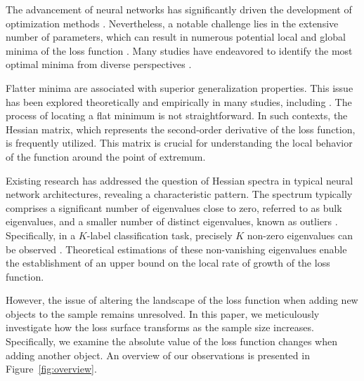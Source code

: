 \documentclass{article}
\begin{document}
The advancement of neural networks has significantly driven the development of optimization methods \cite{choi2020empiricalcomparisonsoptimizersdeep, Soydaner_2020, schmidt2021descendingcrowdedvalley}. Nevertheless, a notable challenge lies in the extensive number of parameters, which can result in numerous potential local and global minima of the loss function \cite{neyshabur2018the, zou2019improvedanalysistrainingoverparameterized, allenzhu2019convergencetheorydeeplearning, allenzhu2020learninggeneralizationoverparameterizedneural}. Many studies have endeavored to identify the most optimal minima from diverse perspectives \cite{choromanska2015losssurfacesmultilayernetworks, you2017largebatchtrainingconvolutional, li2018visualizinglosslandscapeneural}.

Flatter minima are associated with superior generalization properties. This issue has been explored theoretically and empirically in many studies, including \cite{NIPS1994_01882513, neyshabur2017exploringgeneralizationdeeplearning, dinh2017sharpminimageneralizedeep, fort2019emergentpropertieslocalgeometry}. The process of locating a flat minimum is not straightforward. In such contexts, the Hessian matrix, which represents the second-order derivative of the loss function, is frequently utilized. This matrix is crucial for understanding the local behavior of the function around the point of extremum.

Existing research \cite{pmlr-v97-ghorbani19b, sagun2018empiricalanalysishessianoverparametrized, papyan2019spectrumdeepnethessiansscale, liao2021hessianeigenspectrarealisticnonlinear, dauphin2024neglectedhessiancomponentexplains, papyan2020tracesclasscrossclassstructurepervade, papyan2019measurementsthreelevelhierarchicalstructure, garrod2024unifyinglowdimensionalobservations} has addressed the question of Hessian spectra in typical neural network architectures, revealing a characteristic pattern. The spectrum typically comprises a significant number of eigenvalues close to zero, referred to as bulk eigenvalues, and a smaller number of distinct eigenvalues, known as outliers \cite{pmlr-v97-ghorbani19b}. Specifically, in a $K$-label classification task, precisely $K$ non-zero eigenvalues can be observed \cite{sagun2018empiricalanalysishessianoverparametrized, papyan2019spectrumdeepnethessiansscale}. Theoretical estimations of these non-vanishing eigenvalues enable the establishment of an upper bound on the local rate of growth of the loss function.

However, the issue of altering the landscape of the loss function when adding new objects to the sample remains unresolved. In this paper, we meticulously investigate how the loss surface transforms as the sample size increases. Specifically, we examine the absolute value of the loss function changes when adding another object. An overview of our observations is presented in Figure~\ref{fig:overview}.
\end{document}
